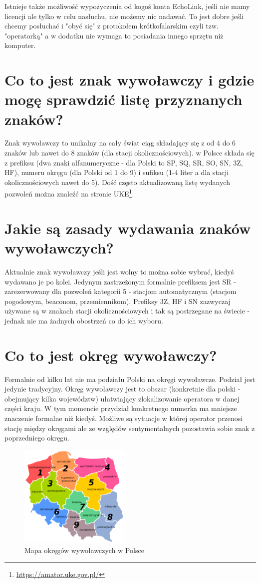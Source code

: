 \documentclass[a4paper,12pt]{article}
\begin{document}
Istnieje także możliwość wypożyczenia od kogoś konta EchoLink, jeśli nie mamy licencji ale tylko w celu nasłuchu, nie możemy nic nadawać. To jest dobre jeśli chcemy posłuchać i "obyć się" z protokołem krótkofalarskim czyli tzw. "operatorką" a w dodatku nie wymaga to posiadania innego sprzętu niż komputer.

\section{Co to jest znak wywoławczy i gdzie mogę sprawdzić listę przyznanych znaków?}
Znak wywoławczy to unikalny na cały świat ciąg składający się z od 4 do 6 znaków lub nawet do 8 znaków (dla stacji okolicznościowych). w Polsce składa się z prefiksu (dwa znaki alfanumeryczne - dla Polski to SP, SQ, SR, SO, SN, 3Z, HF), numeru okręgu (dla Polski od 1 do 9) i sufiksu (1-4 liter a dla stacji okolicznościowych nawet do 5).
Dość często aktualizowaną listę wydanych pozwoleń można znaleźć na stronie UKE\footnote{\url{https://amator.uke.gov.pl/}}.


\section{Jakie są zasady wydawania znaków wywoławczych?}
Aktualnie znak wywoławczy jeśli jest wolny to można sobie wybrać, kiedyś wydawano je po kolei. Jedynym zastrzeżonym formalnie prefiksem jest SR - zarezerwowany dla pozwoleń kategorii 5 - stacjom automatycznym (stacjom pogodowym, beaconom, przemiennikom). Prefiksy 3Z, HF i SN zazwyczaj używane są w znakach stacji okolicznościowych i tak są postrzegane na świecie - jednak nie ma żadnych obostrzeń co do ich wyboru.

\section{Co to jest okręg wywoławczy?}
Formalnie od kilku lat nie ma podziału Polski na okręgi wywoławcze. Podział jest jedynie tradycyjny. Okręg wywoławczy jest to obszar (konkretnie dla polski - obejmujący kilka województw) ułatwiający zlokalizowanie operatora w danej części kraju. W tym momencie przydział konkretnego numerka ma mniejsze znaczenie formalne niż kiedyś. Możliwe są sytuacje w której operator przenosi stację między okręgami ale ze względów sentymentalnych pozostawia sobie znak z poprzedniego okręgu. 
\begin{figure}[h]
 \centering
 \includegraphics[width=150pt]{./Polish_HAM_Radio_Regions.png}
 \caption{Mapa okręgów wywoławczych w Polsce}
\end{figure}
\end{document}
